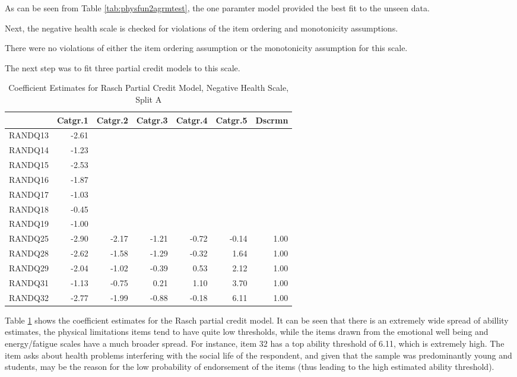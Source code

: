 \documentclass{article}
\begin{document}
As can be seen from Table \ref{tab:physfun2agrmtest}, the one paramter model provided the best fit to the unseen data. 


Next, the negative health scale is checked for violations of the item ordering and monotonicity assumptions. 


There were no violations of either the item ordering assumption or the monotonicity assumption for this scale. 

The next step was to fit three partial credit models to this scale. 


\begin{table}[ht]
\centering
\begin{tabular}{rrrrrrr}
  \hline
 & Catgr.1 & Catgr.2 & Catgr.3 & Catgr.4 & Catgr.5 & Dscrmn \\ 
  \hline
RANDQ13 & -2.61 &  &  &  &  &  \\ 
  RANDQ14 & -1.23 &  &  &  &  &  \\ 
  RANDQ15 & -2.53 &  &  &  &  &  \\ 
  RANDQ16 & -1.87 &  &  &  &  &  \\ 
  RANDQ17 & -1.03 &  &  &  &  &  \\ 
  RANDQ18 & -0.45 &  &  &  &  &  \\ 
  RANDQ19 & -1.00 &  &  &  &  &  \\ 
  RANDQ25 & -2.90 & -2.17 & -1.21 & -0.72 & -0.14 & 1.00 \\ 
  RANDQ28 & -2.62 & -1.58 & -1.29 & -0.32 & 1.64 & 1.00 \\ 
  RANDQ29 & -2.04 & -1.02 & -0.39 & 0.53 & 2.12 & 1.00 \\ 
  RANDQ31 & -1.13 & -0.75 & 0.21 & 1.10 & 3.70 & 1.00 \\ 
  RANDQ32 & -2.77 & -1.99 & -0.88 & -0.18 & 6.11 & 1.00 \\ 
   \hline
\end{tabular}
\caption{Coefficient Estimates for Rasch Partial Credit Model, Negative Health Scale, Split A} 
\label{tab:neghealth2apcmrasch}
\end{table}
Table \ref{tab:neghealth2apcmrasch} shows the coefficient estimates for the Rasch partial credit model. It can be seen that there is an extremely wide spread of abillity estimates, the physical limitations items tend to have quite low thresholds, while the items drawn from the emotional well being and energy/fatigue scales have a much broader spread. For instance, item 32 has a top ability threshold of 6.11, which is extremely high. The item asks about health problems interfering with the social life of the respondent, and given that the sample was predominantly young and students, may be the reason for the low probability of endorsement of the items (thus leading to the high estimated ability threshold). 
\end{document}
